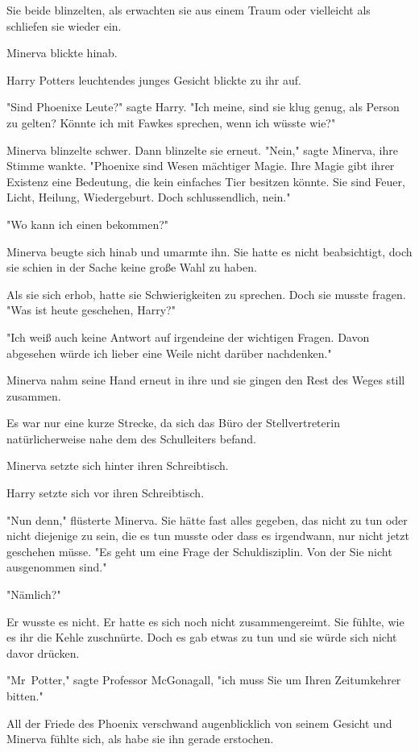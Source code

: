 {Sie beide blinzelten, als erwachten sie aus einem Traum oder vielleicht als schliefen sie wieder ein.

Minerva blickte hinab.

Harry Potters leuchtendes junges Gesicht blickte zu ihr auf.

"Sind Phoenixe Leute?" sagte Harry. "Ich meine, sind sie klug genug, als Person zu gelten? Könnte ich mit Fawkes sprechen, wenn ich wüsste wie?"

Minerva blinzelte schwer. Dann blinzelte sie erneut. "Nein," sagte Minerva, ihre Stimme wankte. "Phoenixe sind Wesen mächtiger Magie. Ihre Magie gibt ihrer Existenz eine Bedeutung, die kein einfaches Tier besitzen könnte. Sie sind Feuer, Licht, Heilung, Wiedergeburt. Doch schlussendlich, nein."

"Wo kann ich einen bekommen?"

Minerva beugte sich hinab und umarmte ihn. Sie hatte es nicht beabsichtigt, doch sie schien in der Sache keine große Wahl zu haben.

Als sie sich erhob, hatte sie Schwierigkeiten zu sprechen. Doch sie musste fragen. "Was ist heute geschehen, Harry?"

"Ich weiß auch keine Antwort auf irgendeine der wichtigen Fragen. Davon abgesehen würde ich lieber eine Weile nicht darüber nachdenken."

Minerva nahm seine Hand erneut in ihre und sie gingen den Rest des Weges still zusammen.

Es war nur eine kurze Strecke, da sich das Büro der Stellvertreterin natürlicherweise nahe dem des Schulleiters befand.

Minerva setzte sich hinter ihren Schreibtisch.

Harry setzte sich vor ihren Schreibtisch.

"Nun denn," flüsterte Minerva. Sie hätte fast alles gegeben, das nicht zu tun oder nicht diejenige zu sein, die es tun musste oder dass es irgendwann, nur nicht jetzt geschehen müsse. "Es geht um eine Frage der Schuldisziplin. Von der Sie nicht ausgenommen sind."

"Nämlich?"

Er wusste es nicht. Er hatte es sich noch nicht zusammengereimt. Sie fühlte, wie es ihr die Kehle zuschnürte. Doch es gab etwas zu tun und sie würde sich nicht davor drücken.

"Mr~Potter," sagte Professor McGonagall, "ich muss Sie um Ihren Zeitumkehrer bitten."

All der Friede des Phoenix verschwand augenblicklich von seinem Gesicht und Minerva fühlte sich, als habe sie ihn gerade erstochen.

}
